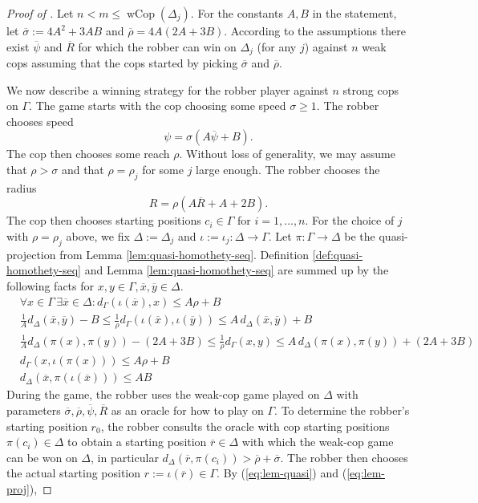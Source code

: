 \documentclass[10pt,a4paper]{amsart}
\renewcommand{\geq}{\geqslant}
\renewcommand{\leq}{\leqslant}
\newcommand{\wCop}{\operatorname{wCop}}
\begin{document}
\begin{proof}[Proof of ]


	Let \(n < m \leq \wCop(\Delta_j)\). For the constants $A,B$ in the statement, let $\overline{\sigma} := 4A^2+3AB$ and $\overline{\rho} = 4A(2A+3B)$. According to the assumptions there exist $\overline{\psi}$ and $\overline{R}$ for which the robber can win on $\Delta_j$ (for any $j$) against $n$ weak cops assuming that the cops started by picking $\overline{\sigma}$ and $\overline{\rho}$.

    We now describe a winning strategy for the robber player against $n$ strong cops on $\Gamma$. The game starts with the cop choosing some speed $\sigma \geq 1$. The robber chooses speed
    $$
    \psi = \sigma  \left( A \overline{\psi} + B\right) .
    $$
    The cop then chooses some reach $\rho$. Without loss of generality, we may assume that $\rho > \sigma$ and that $\rho = \rho_j$ for some $j$ large enough. The robber chooses the radius
    $$
    R = \rho (A\overline{R} + A + 2B).
    $$
    The cop then chooses starting positions $c_i \in \Gamma$ for $i = 1 , \ldots , n$. For the choice of $j$ with $\rho = \rho_j$ above, we fix $\Delta := \Delta_j$ and $\iota := \iota_j \colon \Delta \to \Gamma$. Let $\pi  \colon \Gamma \to \Delta$ be the quasi-projection from Lemma \ref{lem:quasi-homothety-seq}. Definition \ref{def:quasi-homothety-seq} and Lemma \ref{lem:quasi-homothety-seq} are summed up by the following facts for $x,y \in \Gamma, \overline{x}, \overline{y} \in \Delta$.
    \setcounter{equation}{0}
    \begin{align}
        &\forall x \in \Gamma \, \exists \overline{x} \in \Delta \colon d_{\Gamma}(\iota(\overline{x}),x) \leq A\rho + B \label{eq:def-surj} \\
    & \frac{1}{A} d_{\Delta}(\overline{x},\overline{y}) - B \leq \frac{1}{\rho}d_{\Gamma}(\iota(\overline{x}),\iota(\overline{y}))  \leq A \, d_{\Delta}(\overline{x},\overline{y}) + B \label{eq:def-quasi} \\
    &\frac{1}{A}  d_{\Delta}(\pi(x),\pi(y))  -  (2A + 3B) \leq \frac{1}{\rho} d_{\Gamma}(x,y)\leq A\,  d_{\Delta}(\pi(x),\pi(y))  +  (2A + 3B) \label{eq:lem-quasi} \\
    &    d_{\Gamma}(x,\iota(\pi(x))) \leq A\rho+ B \label{eq:lem-surj} \\
    & d_{\Delta}(\overline{x}, \pi(\iota(\overline{x})) ) \leq AB \label{eq:lem-proj}
    \end{align}
    During the game, the robber uses the weak-cop game played on $\Delta$ with parameters $\overline{\sigma}, \overline{\rho}, \overline{\psi} , \overline{R}$ as an oracle for how to play on $\Gamma$. To determine the robber's starting position $r_0$, the robber consults the oracle with cop starting positions $\pi(c_i) \in \Delta$ to obtain a starting position $\overline{r} \in \Delta$ with which the weak-cop game can be won on $\Delta$, in particular $d_\Delta(\overline{r}, \pi(c_i)) > \overline{\rho} + \overline{\sigma}$. The robber then chooses the actual starting position $r := \iota(\overline{r}) \in \Gamma$. By (\ref{eq:lem-quasi}) and (\ref{eq:lem-proj}),

\end{proof}
\end{document}
